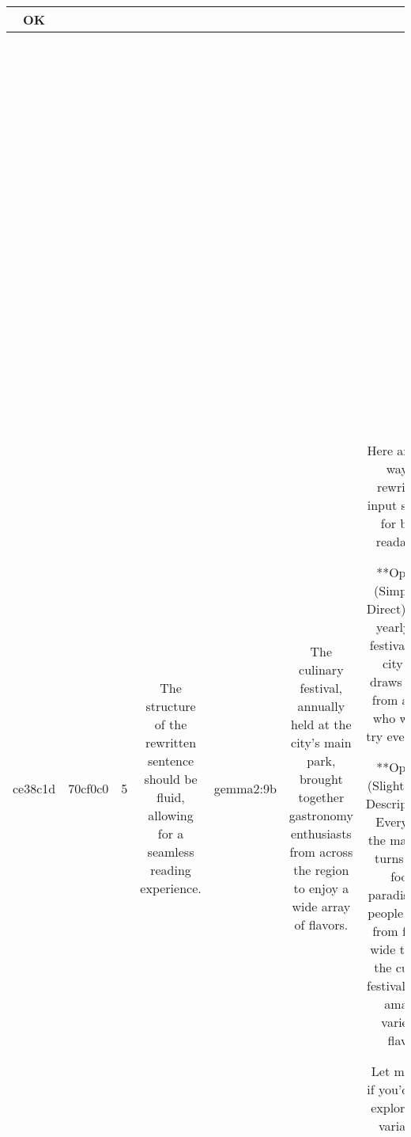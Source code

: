 \begin{table}[h!]
\begin{tabular}{|c|c|c|c|c|c|c|c|c|c|}
OK & \\
\hline
ce38c1d & 70cf0c0 & 5 & The structure of the rewritten sentence should be fluid, allowing for a seamless reading experience. & gemma2:9b & The culinary festival, annually held at the city's main park, brought together gastronomy enthusiasts from across the region to enjoy a wide array of flavors. & Here are a few ways to rewrite the input sentence for better readability:

**Option 1 (Simple and Direct):**  The yearly food festival in the city park draws foodies from all over who want to try everything!

**Option 2 (Slightly More Descriptive):** Every year, the main park turns into a foodie paradise, with people coming from far and wide to enjoy the culinary festival and its amazing variety of flavors. 


Let me know if you'd like to explore other variations! & ok & The chatbot output provides two rewritten versions of an unspecified input sentence, aimed at enhancing readability and making it more conversational. The output options showcase a change in style and wording, which aligns with the requirement to make the sentence more engaging and fluid. Both options appear to simplify complex phrases and aim for clarity and relatability, which fits the description of using language that's easy for a broader audience to understand. However, without the input sentence, I cannot assess if the factual accuracy and original meaning have been preserved, but per your instruction, I will ignore any part of the description which requires the input. 

There are no parts of the description being violated which can be verified without the input, and given the holistic nature of the chatbot's task to provide engaging and simplified sentence transformations, the output adheres to the specified goal of improving individual sentences, as it provides variations that are likely to meet those objectives.

No violation.
OK & \\
\hline
ce38c1d & 70cf0c0 & 5 & The structure of the rewritten sentence should be fluid, allowing for a seamless reading experience. & qwen2.5:3b & The culinary festival, annually held at the city's main park, brought together gastronomy enthusiasts from across the region to enjoy a wide array of flavors. & Every year, the city's main park hosts a culinary fest where foodies from all over join to try lots of different foods. & ok & The chatbot output presents a sentence that is conversational in tone, avoids complex phrases, and offers a clear, engaging structure. The sentence uses simple language that is easy to relate to, and the readability seems to be enhanced. Since the original input is not available, the assessment of preservation of original meaning and factual accuracy cannot be evaluated. However, based on the part of the description that can be assessed without the input, the output appears to meet the requirement of being conversational and easy to read.


\end{tabular}
\end{table}
